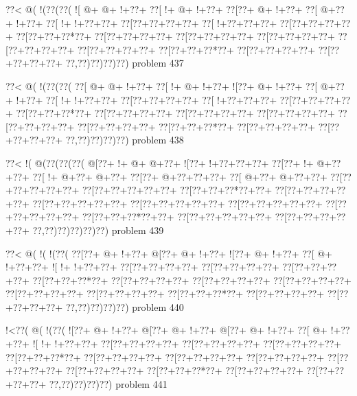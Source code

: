 \vbox{\vbox{\goo
\0??<\- @(\- !(\0??(\0??(
\- ![\- @+\- @+\- !+\0??+
\0??[\- !+\- @+\- !+\0??+
\0??[\0??+\- @+\- !+\0??+
\0??[\- @+\0??+\- !+\0??+
\0??[\- !+\- !+\0??+\0??+
\0??[\0??+\0??+\0??+\0??+
\0??[\- !+\0??+\0??+\0??+
\0??[\0??+\0??+\0??+\0??+
\0??[\0??+\0??+\0??*\0??+
\0??[\0??+\0??+\0??+\0??+
\0??[\0??+\0??+\0??+\0??+
\0??[\0??+\0??+\0??+\0??+
\0??[\0??+\0??+\0??+\0??+
\0??[\0??+\0??+\0??+\0??+
\0??[\0??+\0??+\0??*\0??+
\0??[\0??+\0??+\0??+\0??+
\0??[\0??+\0??+\0??+\0??+
\0??,\0??)\0??)\0??)\0??)
}
\hfil problem 437\hfil\break
}

\vbox{\vbox{\goo
\0??<\- @(\- !(\0??(\0??(
\0??[\- @+\- @+\- !+\0??+
\0??[\- !+\- @+\- !+\0??+
\- ![\0??+\- @+\- !+\0??+
\0??[\- @+\0??+\- !+\0??+
\0??[\- !+\- !+\0??+\0??+
\0??[\0??+\0??+\0??+\0??+
\0??[\- !+\0??+\0??+\0??+
\0??[\0??+\0??+\0??+\0??+
\0??[\0??+\0??+\0??*\0??+
\0??[\0??+\0??+\0??+\0??+
\0??[\0??+\0??+\0??+\0??+
\0??[\0??+\0??+\0??+\0??+
\0??[\0??+\0??+\0??+\0??+
\0??[\0??+\0??+\0??+\0??+
\0??[\0??+\0??+\0??*\0??+
\0??[\0??+\0??+\0??+\0??+
\0??[\0??+\0??+\0??+\0??+
\0??,\0??)\0??)\0??)\0??)
}
\hfil problem 438\hfil\break
}

\vbox{\vbox{\goo
\0??<\- !(\- @(\0??(\0??(\0??(
\- @[\0??+\- !+\- @+\- @+\0??+
\- ![\0??+\- !+\0??+\0??+\0??+
\0??[\0??+\- !+\- @+\0??+\0??+
\0??[\- !+\- @+\0??+\- @+\0??+
\0??[\0??+\- @+\0??+\0??+\0??+
\0??[\- @+\0??+\- @+\0??+\0??+
\0??[\0??+\0??+\0??+\0??+\0??+
\0??[\0??+\0??+\0??+\0??+\0??+
\0??[\0??+\0??+\0??*\0??+\0??+
\0??[\0??+\0??+\0??+\0??+\0??+
\0??[\0??+\0??+\0??+\0??+\0??+
\0??[\0??+\0??+\0??+\0??+\0??+
\0??[\0??+\0??+\0??+\0??+\0??+
\0??[\0??+\0??+\0??+\0??+\0??+
\0??[\0??+\0??+\0??*\0??+\0??+
\0??[\0??+\0??+\0??+\0??+\0??+
\0??[\0??+\0??+\0??+\0??+\0??+
\0??,\0??)\0??)\0??)\0??)\0??)
}
\hfil problem 439\hfil\break
}

\vbox{\vbox{\goo
\0??<\- @(\- !(\- !(\0??(
\0??[\0??+\- @+\- !+\0??+
\- @[\0??+\- @+\- !+\0??+
\- ![\0??+\- @+\- !+\0??+
\0??[\- @+\- !+\0??+\0??+
\- ![\- !+\- !+\0??+\0??+
\0??[\0??+\0??+\0??+\0??+
\0??[\0??+\0??+\0??+\0??+
\0??[\0??+\0??+\0??+\0??+
\0??[\0??+\0??+\0??*\0??+
\0??[\0??+\0??+\0??+\0??+
\0??[\0??+\0??+\0??+\0??+
\0??[\0??+\0??+\0??+\0??+
\0??[\0??+\0??+\0??+\0??+
\0??[\0??+\0??+\0??+\0??+
\0??[\0??+\0??+\0??*\0??+
\0??[\0??+\0??+\0??+\0??+
\0??[\0??+\0??+\0??+\0??+
\0??,\0??)\0??)\0??)\0??)
}
\hfil problem 440\hfil\break
}

\vbox{\vbox{\goo
\- !<\0??(\- @(\- !(\0??(
\- ![\0??+\- @+\- !+\0??+
\- @[\0??+\- @+\- !+\0??+
\- @[\0??+\- @+\- !+\0??+
\0??[\- @+\- !+\0??+\0??+
\- ![\- !+\- !+\0??+\0??+
\0??[\0??+\0??+\0??+\0??+
\0??[\0??+\0??+\0??+\0??+
\0??[\0??+\0??+\0??+\0??+
\0??[\0??+\0??+\0??*\0??+
\0??[\0??+\0??+\0??+\0??+
\0??[\0??+\0??+\0??+\0??+
\0??[\0??+\0??+\0??+\0??+
\0??[\0??+\0??+\0??+\0??+
\0??[\0??+\0??+\0??+\0??+
\0??[\0??+\0??+\0??*\0??+
\0??[\0??+\0??+\0??+\0??+
\0??[\0??+\0??+\0??+\0??+
\0??,\0??)\0??)\0??)\0??)
}
\hfil problem 441\hfil\break
}

